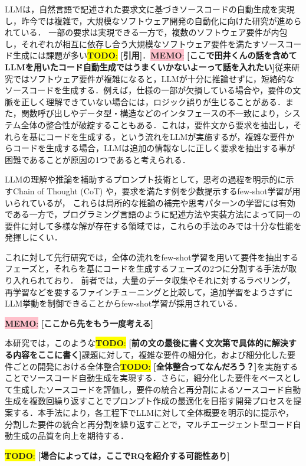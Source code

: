 \documentclass[submit,techrep,noauthor]{ipsj}
\newcommand{\todo}[1]{\colorbox{yellow}{{\bf TODO}:}{\color{red} {\textbf{[#1]}}}}
\newcommand{\memo}[1]{\colorbox{pink}{{\bf MEMO}:}{\color{red} {\textbf{[#1]}}}}
\begin{document}
LLMは，自然言語で記述された要求文に基づきソースコードの自動生成を実現し，昨今では複雑で，大規模なソフトウェア開発の自動化に向けた研究が進められている．\cite{LLM_CodeGeneration} 一部の要求は実現できる一方で，複数のソフトウェア要件が内包し，それぞれが相互に依存し合う大規模なソフトウェア要件を満たすソースコード生成には課題が多い\todo{引用}．\memo{ここで田井くんの話を含めてLLMを用いたコード自動生成ではうまくいかないよーって話を入れたい}従来研究ではソフトウェア要件が複雑になると，LLMが十分に推論せずに，短絡的なソースコードを生成する．例えば，仕様の一部が欠損している場合や，要件の文脈を正しく理解できていない場合には，ロジック誤りが生じることがある．また，関数呼び出しやデータ型・構造などのインタフェースの不一致により，システム全体の整合性が破綻することもある．これは，要件文から要求を抽出し，それらを基にコードを生成する，という流れをLLMが実施するが，複雑な要件からコードを生成する場合，LLMは追加の情報なしに正しく要求を抽出する事が困難であることが原因の1つであると考えられる．

LLMの理解や推論を補助するプロンプト技術として，思考の過程を明示的に示すChain of Thought (CoT) や，要求を満たす例を少数提示するfew-shot学習が用いられているが，\cite{LLM_fewshot} これらは局所的な推論の補完や思考パターンの学習には有効である一方で，プログラミング言語のように記述方法や実装方法によって同一の要件に対して多様な解が存在する領域では，これらの手法のみでは十分な性能を発揮しにくい．

これに対して先行研究では，全体の流れをfew-shot学習を用いて要件を抽出するフェーズと，それらを基にコードを生成するフェーズの2つに分割する手法が取り入れられており．\cite{tosem} 前者では，大量のデータ収集やそれに対するラベリング，再学習などを要するファインチューニングと比較して，追加学習をようさずにLLM挙動を制御できることからfew-shot学習が採用されている．

\memo{ここから先をもう一度考える}

本研究では，このような\todo{前の文の最後に書く文次第で具体的に解決する内容をここに書く}課題に対して，複雑な要件の細分化，および細分化した要件ごとの開発における全体整合\todo{全体整合ってなんだろう？}を実施することでソースコード自動生成を実現する．さらに，細分化した要件をベースとして生成したソースコードを評価し，要件の統合と再分割によるソースコード自動生成を複数回繰り返すことでプロンプト作成の最適化を目指す開発プロセスを提案する．本手法により，各工程下でLLMに対して全体概要を明示的に提示や，分割した要件の統合と再分割を繰り返すことで，マルチエージェント型コード自動生成の品質を向上を期待する．

\todo{場合によっては，ここでRQを紹介する可能性あり}
\end{document}

